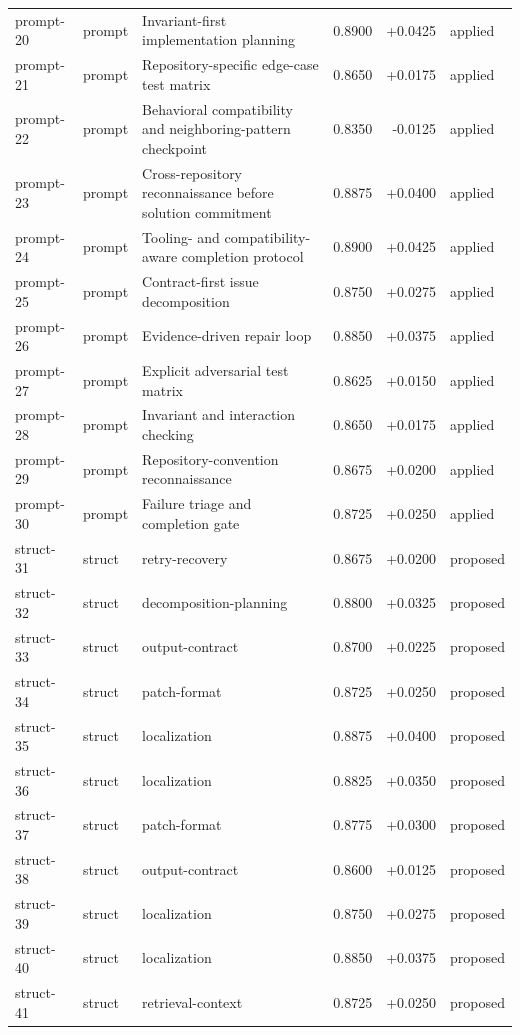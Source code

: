 \begin{center}
\begin{longtable}{llp{5.2cm}rrl}
prompt-20 & prompt & Invariant-first implementation planning & 0.8900 & +0.0425 & applied \\
prompt-21 & prompt & Repository-specific edge-case test matrix & 0.8650 & +0.0175 & applied \\
prompt-22 & prompt & Behavioral compatibility and neighboring-pattern checkpoint & 0.8350 & -0.0125 & applied \\
prompt-23 & prompt & Cross-repository reconnaissance before solution commitment & 0.8875 & +0.0400 & applied \\
prompt-24 & prompt & Tooling- and compatibility-aware completion protocol & 0.8900 & +0.0425 & applied \\
prompt-25 & prompt & Contract-first issue decomposition & 0.8750 & +0.0275 & applied \\
prompt-26 & prompt & Evidence-driven repair loop & 0.8850 & +0.0375 & applied \\
prompt-27 & prompt & Explicit adversarial test matrix & 0.8625 & +0.0150 & applied \\
prompt-28 & prompt & Invariant and interaction checking & 0.8650 & +0.0175 & applied \\
prompt-29 & prompt & Repository-convention reconnaissance & 0.8675 & +0.0200 & applied \\
prompt-30 & prompt & Failure triage and completion gate & 0.8725 & +0.0250 & applied \\
struct-31 & struct & retry-recovery & 0.8675 & +0.0200 & proposed \\
struct-32 & struct & decomposition-planning & 0.8800 & +0.0325 & proposed \\
struct-33 & struct & output-contract & 0.8700 & +0.0225 & proposed \\
struct-34 & struct & patch-format & 0.8725 & +0.0250 & proposed \\
struct-35 & struct & localization & 0.8875 & +0.0400 & proposed \\
struct-36 & struct & localization & 0.8825 & +0.0350 & proposed \\
struct-37 & struct & patch-format & 0.8775 & +0.0300 & proposed \\
struct-38 & struct & output-contract & 0.8600 & +0.0125 & proposed \\
struct-39 & struct & localization & 0.8750 & +0.0275 & proposed \\
struct-40 & struct & localization & 0.8850 & +0.0375 & proposed \\
struct-41 & struct & retrieval-context & 0.8725 & +0.0250 & proposed \\

\end{longtable}
\end{center}
